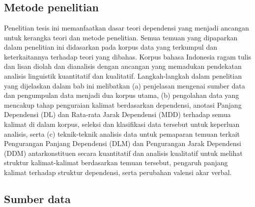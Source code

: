 \chapter{\babTiga} \label{chap:metode_penelitian}

\section{Metode penelitian}
Penelitian tesis ini memanfaatkan dasar teori dependensi yang menjadi ancangan untuk kerangka teori dan metode penelitian. Semua temuan yang dipaparkan dalam penelitian ini didasarkan pada korpus data yang terkumpul dan keterkaitannya terhadap teori yang dibahas. Korpus bahasa Indonesia ragam tulis dan lisan diolah dan dianalisis dengan ancangan yang memadukan pendekatan analisis linguistik kuantitatif dan kualitatif. Langkah-langkah dalam penelitian yang dijelaskan dalam bab ini melibatkan (a) penjelasan mengenai sumber data dan pengumpulan data menjadi dua korpus utama, (b) pengolahan data yang mencakup tahap penguraian kalimat berdasarkan dependensi, anotasi Panjang Dependensi (DL) dan Rata-rata Jarak Dependensi (MDD) terhadap semua kalimat di dalam korpus, seleksi dan klasifikasi data tersebut untuk keperluan analisis, serta (c) teknik-teknik analisis data untuk pemaparan temuan terkait Pengurangan Panjang Dependensi (DLM) dan Pengurangan Jarak Dependensi (DDM) antarkonstituen secara kuantitatif dan analisis kualitatif untuk melihat struktur kalimat-kalimat berdasarkan temuan tersebut, pengaruh panjang kalimat terhadap struktur dependensi, serta perubahan valensi akar verbal.

\section{Sumber data}


